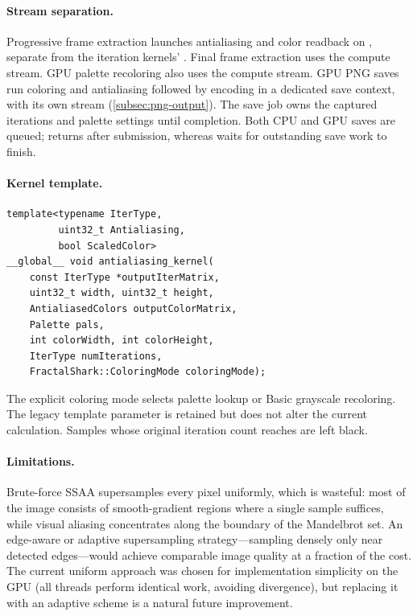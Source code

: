 \paragraph{Stream separation.}
Progressive frame extraction launches antialiasing and color readback
on , separate from the iteration kernels'
. Final frame extraction uses the compute stream.
GPU palette recoloring also uses the compute stream. GPU PNG saves run
coloring and antialiasing followed by encoding in a dedicated save context, with
its own stream (\cref{subsec:png-output}). The save job owns the captured iterations
and palette settings until completion. Both CPU and GPU saves are queued;
 returns after submission, whereas
 waits for outstanding save work to finish.

\paragraph{Kernel template.}
\begin{lstlisting}
template<typename IterType,
         uint32_t Antialiasing,
         bool ScaledColor>
__global__ void antialiasing_kernel(
    const IterType *outputIterMatrix,
    uint32_t width, uint32_t height,
    AntialiasedColors outputColorMatrix,
    Palette pals,
    int colorWidth, int colorHeight,
    IterType numIterations,
    FractalShark::ColoringMode coloringMode);
\end{lstlisting}
The explicit coloring mode selects palette lookup or Basic grayscale
recoloring. The legacy  template parameter is retained
but does not alter the current calculation. Samples whose original
iteration count reaches  are left black.

\paragraph{Limitations.}
Brute-force SSAA supersamples every pixel uniformly, which is
wasteful: most of the image consists of smooth-gradient regions where
a single sample suffices, while visual aliasing concentrates along the
boundary of the Mandelbrot set.  An edge-aware or adaptive
supersampling strategy---sampling densely only near detected
edges---would achieve comparable image quality at a fraction of the
cost.  The current uniform approach was chosen for implementation
simplicity on the GPU (all threads perform identical work, avoiding
divergence), but replacing it with an adaptive scheme is a natural
future improvement.


